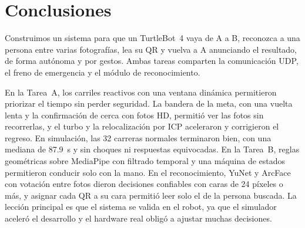 \documentclass[11pt,a4paper]{article}
\begin{document}
\section{Conclusiones}

Construimos un sistema para que un TurtleBot~4 vaya de A a B, reconozca a una persona entre varias fotografías, lea su QR y vuelva a A anunciando el resultado, de forma autónoma y por gestos. Ambas tareas comparten la comunicación UDP, el freno de emergencia y el módulo de reconocimiento.

En la Tarea~A, los carriles reactivos con una ventana dinámica permitieron priorizar el tiempo sin perder seguridad. La bandera de la meta, con una vuelta lenta y la confirmación de cerca con fotos HD, permitió ver las fotos sin recorrerlas, y el turbo y la relocalización por ICP aceleraron y corrigieron el regreso. En simulación, las 32 carreras normales terminaron bien, con una mediana de \SI{87,9}{\second} y sin choques ni respuestas equivocadas. En la Tarea~B, reglas geométricas sobre MediaPipe con filtrado temporal y una máquina de estados permitieron conducir solo con la mano. En el reconocimiento, YuNet y ArcFace con votación entre fotos dieron decisiones confiables con caras de 24 píxeles o más, y asignar cada QR a su cara permitió leer solo el de la persona buscada. La lección principal es que el sistema se valida en el robot, ya que el simulador aceleró el desarrollo y el hardware real obligó a ajustar muchas decisiones.
\end{document}

